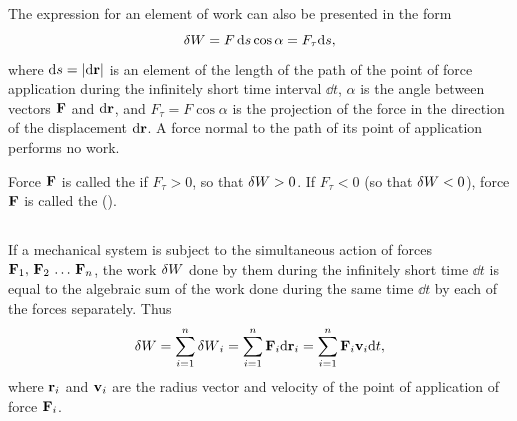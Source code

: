 \subsection{}\label{3.1.3} The expression for an element of work can also be pre­sented in the form
\begin{equation*}%
\var{W} = F \, \dd s \cos \alpha = F_{\tau} \dd s,
\end{equation*}
where $\dd s = \abs{\dd \vb{r}}$ is an element of the length of the path of the point of force application during the infinitely short time interval $\dd t$, $\alpha$ is the angle between vectors $\vb{F}$ and $\dd \vb{r}$, and $F_{\tau} = F \cos \alpha$ is the projection of the force in the direction of the displacement $\dd \vb{r}$. A force normal to the path of its point of appli­cation performs no work.

Force $\vb{F}$ is called the  if $F_{\tau} >0$, so that $\var{W} > 0$. If $F_{\tau} < 0$ (so that $\var{W} < 0$), force $\vb{F}$ is called the  ().

\subsection{}\label{3.1.4} If a mechanical system is subject to the simultaneous action of forces $ \vb{F}_{1},\,\vb{F}_{2}\, \ldots \,\vb{F}_{n}$, the work $\var{W}$ done by them during the infinitely short time $\dd t$ is equal to the algebraic sum of the work done during the same time $\dd t$ by each of the forces separately. Thus
\begin{equation*}%
\var{W} = \sum_{i=1}^{n} \var{W}_{i} = \sum_{i=1}^{n} \vb{F}_{i} \dd \vb{r}_{i} = \sum_{i=1}^{n} \vb{F}_{i}\vb{v}_{i} \dd t,
\end{equation*}
where $\vb{r}_{i}$ and $\vb{v}_{i}$ are the radius vector and velocity of the point of application of force $\vb{F}_{i}$.

